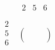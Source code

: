 \documentclass[10pt,]{book}
\theoremstyle{plain}
\theoremstyle{definition}
\theoremstyle{definition}
\theoremstyle{definition}
\theoremstyle{definition}
\begin{document}
\begin{equation*}
\begin{array}{cc}
   & 
\begin{array}{ccc}
 2 & 5 & 6 \\
\end{array}
 \\
 
\begin{array}{c}
 2 \\
 5 \\
 6 \\
\end{array}
 & \left(
\begin{array}{ccc}
   &   &   \\
   &   &   \\
   &   &   \\
\end{array}
\right) \\
\end{array}\end{equation*} 
\end{document}
